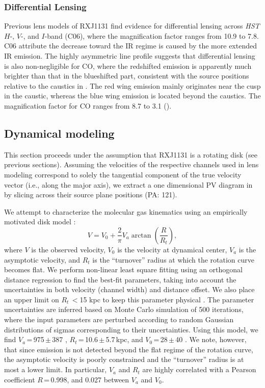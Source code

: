 \documentclass[]{emulateapj}
\begin{document}
\subsubsection{Differential Lensing} \label{sec:differential} %

Previous lens models of RXJ1131 find evidence for
differential lensing across {\it HST}
$H$-, $V$-, and $I$-band (C06), where the
magnification factor ranges from 10.9 to 7.8. C06 attribute
the decrease toward the IR regime is caused by the more extended
IR emission. The highly asymmetric \bco line profile suggests that
differential lensing is also non-negligible for CO, where the redshifted
emission is apparently much brighter than that in the
blueshifted part, consistent
with the source positions relative to the caustics in .
The red wing emission mainly originates near the cusp
in the caustic, whereas the blue wing emission is located beyond the caustics.
The magnification factor for CO ranges from 8.7 to 3.1 ().

\subsection{\bco Dynamical modeling} \label{sec:dynamics} %
This section proceeds under the assumption that RXJ1131 is
a rotating disk (see previous sections).
Assuming the velocities of the respective channels used in
lens modeling correspond to solely the tangential component of the
true velocity vector (i.e., along the major axis), we extract
a one dimensional PV diagram in 
by slicing across their source plane positions (PA: 121\degr).

We attempt to characterize the molecular gas kinematics using an empirically motivated disk model \citep[\eg][]{Courteau97a,Puech08a,Miller11a}:
\begin{equation}
V = V_0 + \frac{2}{\pi} V_{a} \arctan(\frac{R}{R_{t}}),
\end{equation}
where $V$ is the observed velocity, $V_0$ is the velocity at dynamical center,
$V_{a}$ is the asymptotic velocity, and $R_{t}$ is the ``turnover''
radius at which the rotation curve becomes flat.
We perform non-linear least square fitting using an orthogonal distance
regression to find the best-fit parameters,
taking into account the uncertainties in both velocity (channel width) and
distance offset. We also place an upper limit on $R_{t}$\,$<$15 kpc
to keep this parameter physical \citep[\eg][]{Puech08a,Miller11a}.
The parameter uncertainties are inferred based on Monte Carlo simulation
of 500 iterations, where the input parameters are perturbed
according to random Gaussian distributions of sigmas
corresponding to their uncertainties.
Using this model, we find $V_{a}$\,=\,975\,$\pm$\,387 \kms,
$R_{t}$\,=\,10.6\,$\pm$\,5.7\,kpc, and $V_0$\,=\,28\,$\pm$\,40 \kms.
We note, however, that since emission is not detected beyond the flat regime
of the rotation curve, the asymptotic velocity is poorly constrained and
the ``turnover'' radius is at most a lower limit.
In particular, $V_{a}$ and $R_{t}$ are highly correlated with a
Pearson coefficient $R$\,=\,0.998, and 0.027 between $V_{a}$ and $V_0$.
\end{document}
